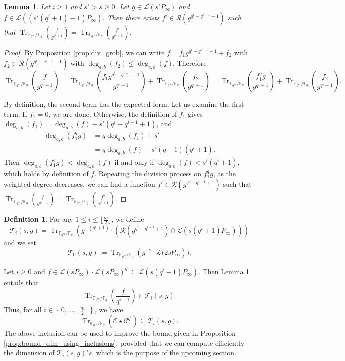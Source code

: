 \documentclass[a4paper]{article}
\newtheorem{lemma}[thm]{Lemma}
\theoremstyle{definition}
\newtheorem{definition}[thm]{Definition}
\theoremstyle{remark}
\newcommand{\calL}{\mathcal{L}}
\newcommand{\calC}{\mathcal{C}}
\newcommand{\calR}{\mathcal{R}}
\newcommand{\calT}{\mathcal{T}}
\newcommand{\fq}{\mathbb{F}_{q}}
\newcommand{\Tr}[1]{\operatorname{Tr}_{\mathbb{F}_{q^m}/\fq}\left(#1\right)}
\newcommand{\set}[1]{\left\{#1\right\}}
\newcommand{\degab}[1]{\deg_{a,b}\left(#1\right)}
\begin{document}
\begin{lemma} \label{lem:weighted_division}
 Let $i \geq 1$ and $s'>s \geq 0$. Let $g \in \calL\left(s'P_\infty\right)$ and $f \in \calL\left(\left(s'(q^i+1)-1\right)P_\infty\right)$. Then there exists $f' \in \calR\left(g^{q^i-q^{i-1}+1}\right)$ such that $\Tr{\frac{f}{g^{q^i+1}}} = \Tr{\frac{f'}{g^{q^i+1}}} $.
\end{lemma}
\begin{proof}
By Proposition \ref{prop:div_grob}, we can write $f=f_1 g^{q^i-q^{i-1}+1} +f_2$ with
 $f_2 \in \calR\left(g^{q^i-q^{i-1}+1}\right)$ with $\degab{f_2} \leq \degab{f}$. Therefore
 \[\Tr{\frac{f}{g^{q^i+1}}}=\Tr{\frac{f_1 g^{q^i-q^{i-1}+1}}{g^{q^i+1}}} +\Tr{\frac{f_2}{g^{q^i+1}}}= \Tr{\frac{f_1^qg}{g^{q^i+1}}} +\Tr{\frac{f_2}{g^{q^i+1}}}. \]
 
 By definition, the second term has the expected form. Let us examine the first term. If $f_1=0$, we are done. Otherwise, the definition of $f_1$ gives
$\degab{f_1} =\degab{f} - s'(q^i-q^{i-1}+1)$, and
 \begin{align*}
 \degab{f_1^qg}  &= q \degab{f_1} + s'\\
     &= q\degab{f} - s'(q-1)(q^i+1).
 \end{align*} 
Then  $\degab{f_1^qg} < \degab{f}$ if and only if $\degab{f} < s'(q^i+1)$, which holds by definition of $f$. Repeating the division process on $f_1^qg$, as the weighted degree decreases, we can find a function $f' \in \calR\left(g^{q^i-q^{i-1}+1}\right)$ such that $\Tr{\frac{f}{g^{q^i+1}}} = \Tr{\frac{f'}{g^{q^i+1}}} $.
\end{proof}
\begin{definition} \label{def:T_i's}
For any $1 \leq i \leq \lfloor\frac{m}{2}\rfloor$, we define
$$\calT_i(s,g)= \Tr{g^{-(q^i+1)}\cdot \left( \calR\left(g^{q^i-q^{i-1}+1}\right)  \cap \calL(s(q^i+1)P_\infty)\right)}$$
and we set $$\calT_0(s,g) := \Tr{g^{-2} \cdot \calL(2sP_\infty}).$$
\end{definition}

\noindent Let $i \geq 0$ and $f \in \calL(sP_\infty) \cdot \calL(sP_\infty)^{q^i} \subseteq \calL(s(q^i+1)P_\infty)$. Then 
Lemma \ref{lem:weighted_division} entails that 
$$\Tr{\dfrac{f}{q^{i+1}}} \in \calT_i(s,g).$$
Thus, for all $i \in \set{0,\dots,\lfloor \frac{m}{2} \rfloor}$, we have \begin{equation} \label{eq:Tr(C*C^q^i)_dans_T_i}
\Tr{\calC \star \calC^{q^i}} \subseteq \calT_i(s,g).
\end{equation}
\noindent The above inclusion can be used to improve the bound given in Proposition \ref{prop:bound_dim_using_inclusions}, provided that we can compute efficiently the dimension of $\calT_i(s,g)'s$, which is the purpose of the upcoming section.
\end{document}
